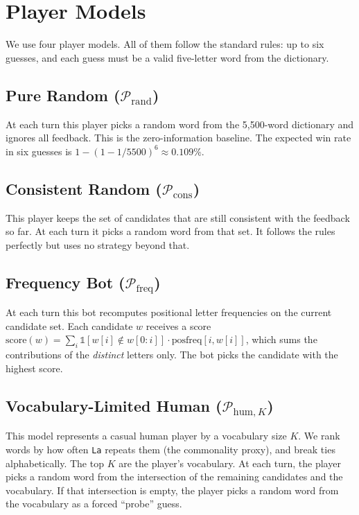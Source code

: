 \documentclass[conference]{IEEEtran}
\begin{document}
\section{Player Models}
\label{sec:models}

We use four player models. All of them follow the standard rules: up
to six guesses, and each guess must be a valid five-letter word from
the dictionary.

\subsection{Pure Random ($\mathcal{P}_{\mathrm{rand}}$)}
At each turn this player picks a random word from the 5{,}500-word
dictionary and ignores all feedback. This is the zero-information
baseline. The expected win rate in six guesses is
$1 - (1 - 1/5500)^6 \approx 0.109\%$.

\subsection{Consistent Random ($\mathcal{P}_{\mathrm{cons}}$)}
This player keeps the set of candidates that are still consistent with
the feedback so far. At each turn it picks a random word from that
set. It follows the rules perfectly but uses no strategy beyond that.

\subsection{Frequency Bot ($\mathcal{P}_{\mathrm{freq}}$)}
At each turn this bot recomputes positional letter frequencies on the
current candidate set. Each candidate $w$ receives a score
$\mathrm{score}(w) = \sum_i \mathbb{1}[w[i] \notin w[0{:}i]] \cdot
\mathrm{posfreq}[i, w[i]]$, which sums the contributions of the
\emph{distinct} letters only. The bot picks the candidate with the
highest score.

\subsection{Vocabulary-Limited Human ($\mathcal{P}_{\mathrm{hum}, K}$)}
\label{sec:human}
This model represents a casual human player by a vocabulary size $K$.
We rank words by how often \texttt{La} repeats them (the commonality
proxy), and break ties alphabetically. The top $K$ are the player's
vocabulary. At each turn, the player picks a random word from the
intersection of the remaining candidates and the vocabulary. If that
intersection is empty, the player picks a random word from the
vocabulary as a forced ``probe'' guess.
\end{document}
